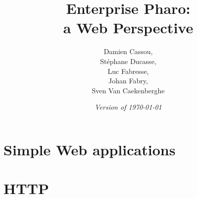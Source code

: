 \graphicspath{
        {../figures/}
        {../Copyright/}
        {../PillarChap/}
        {../Artefact/}
        {../Zinc-HTTP-Client/}
        {../Zinc-HTTP-Server/}
        {../Zinc-Encoding-Meta/}
        {../Zinc-REST/}
        {../Fuel/}
        {../STON/}
        {../Voyage/}
        {../WebApp/}
        {../WebSockets/}
        {../NeoJSON/}
        {../RenoirST/}
        {../NeoCSV/}
        {../Teapot/}
        {../Mustache/}
}
\let\wholebook=\relax
\renewcommand{\nnbb}[2]{} %

\frontmatter
\setcounter{page}{1}
\pagestyle{headings}
\author{
        Damien Cassou,\\ St\'ephane Ducasse,\\ Luc Fabresse,\\ Johan Fabry,\\ Sven Van Caekenberghe}
\title{\Huge\bf Enterprise Pharo:\\a Web Perspective}
\isodate
\date{\emph{Version of \today}}
\maketitle
\tableofcontents

\sloppy %
\mainmatter



\part{Simple Web applications}




\part{HTTP}

